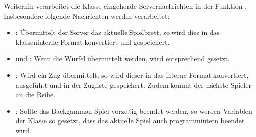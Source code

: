 Weiterhin verarbeitet die Klasse  eingehende Servernachrichten in der Funktion . Insbesondere folgende Nachrichten werden verarbeitet:
\begin{itemize}
  \item {}: Übermittelt der Server das aktuelle Spielbrett, so wird dies in das klasseninterne Format konvertiert und gespeichert.
  \item {} und : Wenn die Würfel übermittelt werden, wird  entsprechend gesetzt.
  \item {}: Wird ein Zug übermittelt, so wird dieser in das interne Format konvertiert, ausgeführt und in der Zugliste gespeichert. Zudem kommt der nächste Spieler an die Reihe.
  \item {}: Sollte das Backgammon-Spiel vorzeitig beendet werden, so werden Variablen der Klasse so gesetzt, dass das aktuelle Spiel auch programmintern beendet wird.
\end{itemize}
